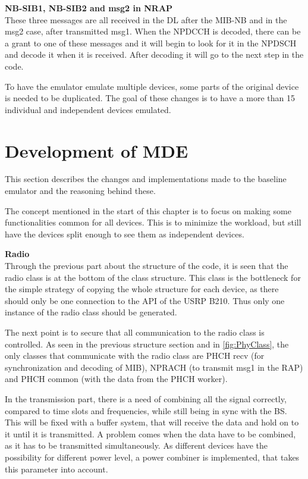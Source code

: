 \textbf{NB-SIB1, NB-SIB2 and msg2 in NRAP} \\

These three messages are all received in the DL after the MIB-NB and in the msg2 case, after transmitted msg1. When the NPDCCH is decoded, there can be a grant to one of these messages and it will begin to look for it in the NPDSCH and decode it when it is received. After decoding it will go to the next step in the code.

To have the emulator emulate multiple devices, some parts of the original device is needed to be duplicated. The goal of these changes is to have a more than 15 individual and independent devices emulated.

\section{Development of MDE}

\label{sec:Changes}

This section describes the changes and implementations made to the baseline emulator and the reasoning behind these.

The concept mentioned in the start of this chapter is to focus on making some functionalities common for all devices. This is to minimize the workload, but still have the devices split enough to see them as independent devices.

\textbf{Radio}\\

Through the previous part about the structure of the code, it is seen that the radio class is at the bottom of the class structure. This class is the bottleneck for the simple strategy of copying the whole structure for each device, as there should only be one connection to the API of the USRP B210. Thus only one instance of the radio class should be generated.

The next point is to secure that all communication to the radio class is controlled. As seen in the previous structure section and in \autoref{fig:PhyClass}, the only classes that communicate with the radio class are PHCH recv (for synchronization and decoding of MIB), NPRACH (to transmit msg1 in the RAP) and PHCH common (with the data from the PHCH worker).

In the transmission part, there is a need of combining all the signal correctly, compared to time slots and frequencies, while still being in sync with the BS. This will be fixed with a buffer system, that will receive the data and hold on to it until it is transmitted. A problem comes when the data have to be combined, as it has to be transmitted simultaneously. As different devices have the possibility for different power level, a power combiner is implemented, that takes this parameter into account.

